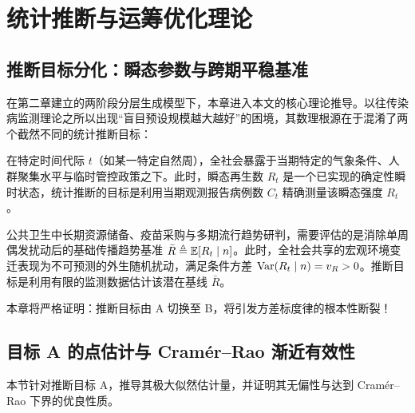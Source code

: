 \chapter{统计推断与运筹优化理论}\label{ch:theory}

\section{推断目标分化：瞬态参数与跨期平稳基准}\label{sec:targets}

在第二章建立的两阶段分层生成模型下，本章进入本文的核心理论推导。以往传染病监测理论之所以出现“盲目预设规模越大越好”的困境，其数理根源在于混淆了两个截然不同的统计推断目标：

\begin{definition}\label{def:target_A}
在特定时间代际 $t$（如某一特定自然周），全社会暴露于当期特定的气象条件、人群聚集水平与临时管控政策之下。此时，瞬态再生数 $R_t$ 是一个已实现的确定性瞬时状态，统计推断的目标是利用当期观测报告病例数 $C_t$ 精确测量该瞬态强度 $R_t$。
\end{definition}

\begin{definition}\label{def:target_B}
公共卫生中长期资源储备、疫苗采购与多期流行趋势研判，需要评估的是消除单周偶发扰动后的基础传播趋势基准 $\bar{R} \triangleq \operatorname{\mathbb{E}}[R_t \mid n]$。此时，全社会共享的宏观环境变迁表现为不可预测的外生随机扰动，满足条件方差 $\operatorname{Var}(R_t \mid n) = v_R > 0$。推断目标是利用有限的监测数据估计该潜在基线 $\bar{R}$。
\end{definition}

本章将严格证明：推断目标由 A 切换至 B，将引发方差标度律的根本性断裂！

\section{目标 A 的点估计与 Cramér--Rao 渐近有效性}\label{sec:prop1}

本节针对推断目标 A，推导其极大似然估计量，并证明其无偏性与达到 Cramér--Rao 下界的优良性质。

